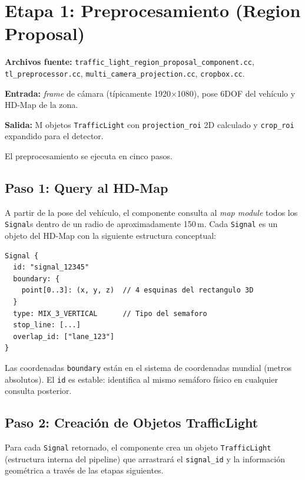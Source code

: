 \section{Etapa 1: Preprocesamiento (Region Proposal)}
\label{sec:funcionamiento_preprocesamiento}

\textbf{Archivos fuente:} \texttt{traffic\_light\_region\_proposal\_component.cc}, \texttt{tl\_preprocessor.cc}, \texttt{multi\_camera\_projection.cc}, \texttt{cropbox.cc}.

\textbf{Entrada:} \textit{frame} de cámara (típicamente 1920$\times$1080), pose 6DOF del vehículo y HD-Map de la zona.

\textbf{Salida:} M objetos \texttt{TrafficLight} con \texttt{projection\_roi} 2D calculado y \texttt{crop\_roi} expandido para el detector.

El preprocesamiento se ejecuta en cinco pasos.

\subsection{Paso 1: Query al HD-Map}

A partir de la pose del vehículo, el componente consulta al \textit{map module} todos los \texttt{Signal}s dentro de un radio de aproximadamente 150\,m. Cada \texttt{Signal} es un objeto del HD-Map con la siguiente estructura conceptual:

\begin{codesnippet}
\begin{verbatim}
Signal {
  id: "signal_12345"
  boundary: {
    point[0..3]: (x, y, z)  // 4 esquinas del rectangulo 3D
  }
  type: MIX_3_VERTICAL      // Tipo del semaforo
  stop_line: [...]
  overlap_id: ["lane_123"]
}
\end{verbatim}
\end{codesnippet}

Las coordenadas \texttt{boundary} están en el sistema de coordenadas mundial (metros absolutos). El \texttt{id} es estable: identifica al mismo semáforo físico en cualquier consulta posterior.

\subsection{Paso 2: Creación de Objetos TrafficLight}

Para cada \texttt{Signal} retornado, el componente crea un objeto \texttt{TrafficLight} (estructura interna del pipeline) que arrastrará el \texttt{signal\_id} y la información geométrica a través de las etapas siguientes.

